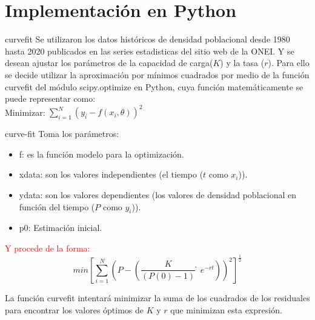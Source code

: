 \documentclass{beamer}
\begin{document}
\section{Implementación en Python}
\begin{frame}{curvefit}
    Se utilizaron los datos históricos de densidad poblacional desde 1980 hasta 2020 publicados en las series estadisticas del sitio web de la ONEI. Y se desean ajustar los parámetros de la capacidad de carga($K$) y la tasa ($r$).
    Para ello se decide utilizar la aproximación por mínimos cuadrados por medio de la función curvefit del módulo scipy.optimize en Python, cuya función matemáticamente se puede representar como:\\
    Minimizar: $\sum_{i=1}^{N} (y_{i} - f(x_{i}, \theta))^2 $ \\
\end{frame}

\begin{frame}{curve-fit}
    Toma los parámetros:
    \begin{itemize}
        \item f: es la función modelo para la optimización.
        \item xdata: son los valores independientes (el tiempo ($t$ como $x_{i}$)).
        \item ydata: son los valores dependientes (los valores de densidad poblacional en función del tiempo ($P$ como $y_{i}$)).
        \item p0: Estimación inicial.
    \end{itemize}
\end{frame}

\begin{frame}
    \begin{block}{\textcolor{red}{Y procede de la forma:}}
    $$min[\sum_{i=1}^{N} (P - (\frac{K}{(P(0)-1)}̇e^{-rt}))^{2}]^{\frac{1}{2}}$$
    \end{block}
La función curvefit intentará minimizar la suma de los cuadrados de los residuales para encontrar los valores óptimos de $K$ y $r$ que minimizan esta expresión. 
\end{frame}
\end{document}
